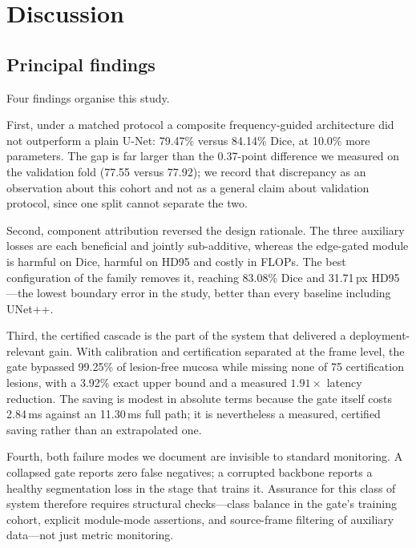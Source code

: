 \documentclass[journal]{IEEEtran}
\begin{document}
\section{Discussion}

\subsection{Principal findings}

Four findings organise this study.

First, under a matched protocol a composite frequency-guided architecture did not outperform a plain U-Net: 79.47\% versus 84.14\% Dice, at 10.0\% more parameters. The gap is far larger than the 0.37-point difference we measured on the validation fold (77.55 versus 77.92); we record that discrepancy as an observation about this cohort and not as a general claim about validation protocol, since one split cannot separate the two.

Second, component attribution reversed the design rationale. The three auxiliary losses are each beneficial and jointly sub-additive, whereas the edge-gated module is harmful on Dice, harmful on HD95 and costly in FLOPs. The best configuration of the family removes it, reaching 83.08\% Dice and 31.71\,px HD95---the lowest boundary error in the study, better than every baseline including UNet++.

Third, the certified cascade is the part of the system that delivered a deployment-relevant gain. With calibration and certification separated at the frame level, the gate bypassed 99.25\% of lesion-free mucosa while missing none of 75 certification lesions, with a 3.92\% exact upper bound and a measured $1.91\times$ latency reduction. The saving is modest in absolute terms because the gate itself costs 2.84\,ms against an 11.30\,ms full path; it is nevertheless a measured, certified saving rather than an extrapolated one.

Fourth, both failure modes we document are invisible to standard monitoring. A collapsed gate reports zero false negatives; a corrupted backbone reports a healthy segmentation loss in the stage that trains it. Assurance for this class of system therefore requires structural checks---class balance in the gate's training cohort, explicit module-mode assertions, and source-frame filtering of auxiliary data---not just metric monitoring.
\end{document}
